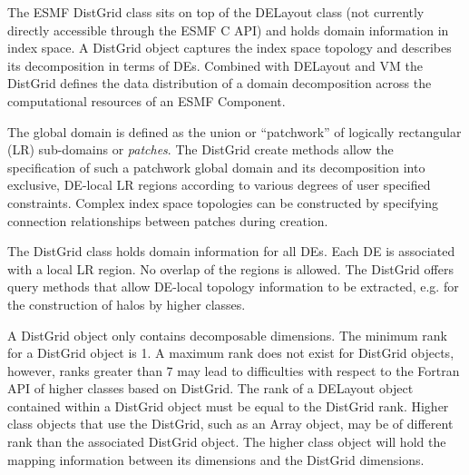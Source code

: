 %


\label{sec:DistGrid}
The ESMF DistGrid class sits on top of the DELayout class (not currently
directly accessible through the ESMF C API) and holds domain
information in index space. 
A DistGrid object captures the index space topology
and describes its decomposition in terms of DEs. Combined with DELayout and VM
the DistGrid defines the data distribution of a domain decomposition across the
computational resources of an ESMF Component.

The global domain is defined as the union or ``patchwork'' of logically
rectangular (LR) sub-domains or {\em patches}. The DistGrid create methods allow
the specification of such a patchwork global domain and its decomposition into
exclusive, DE-local LR regions according to various degrees of user specified
constraints. Complex index space topologies can be constructed by specifying
connection relationships between patches during creation.

The DistGrid class holds domain information for all DEs. Each DE is associated
with a local LR region. No overlap of the regions is allowed. The DistGrid
offers query methods that allow DE-local topology information to be extracted,
e.g. for the construction of halos by higher classes.

A DistGrid object only contains decomposable dimensions. The minimum rank for a
DistGrid object is 1. A maximum rank does not exist for DistGrid objects, 
however, ranks greater than 7 may lead to difficulties with respect to the
Fortran API of higher classes based on DistGrid. The rank of a DELayout object
contained within a DistGrid object must be equal to the DistGrid rank. Higher
class objects that use the DistGrid, such as an Array object, may be of
different rank than the associated DistGrid object. The higher class object
will hold the mapping information between its dimensions and the DistGrid
dimensions.
